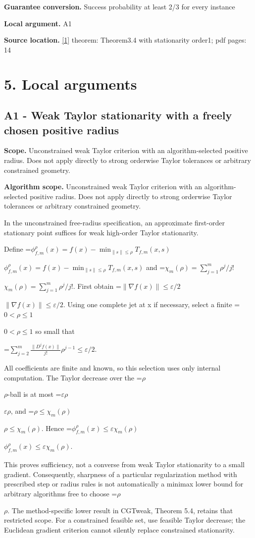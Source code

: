 \documentclass[10pt,a4paper]{article}
\newcommand{\AtlasMath}[1]{\par\begingroup\centering\setbox0=\hbox{$\displaystyle #1$}\ifdim\wd0>1.4\linewidth\typeout{ATLAS WIDE FORMULA: \the\wd0}\fi\ifdim\wd0>\linewidth\resizebox{\linewidth}{!}{\box0}\else\box0\fi\par\endgroup}
\newcommand{\AtlasInlineMath}[1]{\begingroup\setbox0=\hbox{$#1$}\ifdim\wd0>.4\linewidth\endgroup\AtlasMath{#1}\else\endgroup$#1$\fi}
\begin{document}
\textbf{Guarantee conversion.} Success probability at least 2/3 for every instance

\textbf{Local argument.} A1

\textbf{Source location.} \href{https://arxiv.org/abs/1811.01220}{[1]} theorem: Theorem3.4 with stationarity order1; pdf pages: 14

\section{5. Local arguments}
\subsection{A1 - Weak Taylor stationarity with a freely chosen positive radius}
\textbf{Scope.} Unconstrained weak Taylor criterion with an algorithm-selected positive radius. Does not apply directly to strong orderwise Taylor tolerances or arbitrary constrained geometry.

\textbf{Algorithm scope.} Unconstrained weak Taylor criterion with an algorithm-selected positive radius. Does not apply directly to strong orderwise Taylor tolerances or arbitrary constrained geometry.

In the unconstrained free-radius specification, an approximate first-order stationary point suffices for weak high-order Taylor stationarity.

Define \AtlasInlineMath{\phi_{f,m}^{\rho}(x)=f(x)-\min_{\|s\|\le\rho}T_{f,m}(x,s)} and \AtlasInlineMath{\chi_m(\rho)=\sum_{j=1}^m\rho^j/j!}. First obtain \AtlasInlineMath{\|\nabla f(x)\|\le\varepsilon/2}. Using one complete jet at x if necessary, select a finite \AtlasInlineMath{0<\rho\le1} so small that

\AtlasMath{\sum_{j=2}^m\frac{\|D^jf(x)\|}{j!}\rho^{j-1}\le\varepsilon/2.}

All coefficients are finite and known, so this selection uses only internal computation. The Taylor decrease over the \AtlasInlineMath{\rho}-ball is at most \AtlasInlineMath{\varepsilon\rho}, and \AtlasInlineMath{\rho\le\chi_m(\rho)}. Hence \AtlasInlineMath{\phi_{f,m}^{\rho}(x)\le\varepsilon\chi_m(\rho)}.

This proves sufficiency, not a converse from weak Taylor stationarity to a small gradient. Consequently, sharpness of a particular regularization method with prescribed step or radius rules is not automatically a minimax lower bound for arbitrary algorithms free to choose \AtlasInlineMath{\rho}. The method-specific lower result in CGTweak, Theorem 5.4, retains that restricted scope. For a constrained feasible set, use feasible Taylor decrease; the Euclidean gradient criterion cannot silently replace constrained stationarity.
\end{document}
